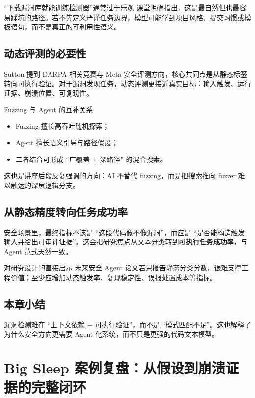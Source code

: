\documentclass[a4paper]{article}
\begin{document}
\begin{warningbox}{“下载漏洞库就能训练检测器”通常过于乐观}
课堂明确指出，这是最自然但也最容易踩坑的路径。若不先定义严谨任务边界，模型可能学到项目风格、提交习惯或模板语句，而不是真正的可利用性语义。
\end{warningbox}

\subsection{动态评测的必要性}
Sutton 提到 DARPA 相关竞赛与 Meta 安全评测方向，核心共同点是从静态标签转向可执行验证。对于漏洞发现任务，动态评测更接近真实目标：输入触发、运行证据、崩溃位置、可复现性。

\begin{knowledgebox}{Fuzzing 与 Agent 的互补关系}
\begin{itemize}
    \item Fuzzing 擅长高吞吐随机探索；
    \item Agent 擅长语义引导与路径假设；
    \item 二者结合可形成 ``广覆盖 + 深路径'' 的混合搜索。
\end{itemize}
这也是讲座后段反复强调的方向：AI 不替代 fuzzing，而是把搜索推向 fuzzer 难以触达的深层逻辑分支。
\end{knowledgebox}

\subsection{从静态精度转向任务成功率}
安全场景里，最终指标不该是 ``这段代码像不像漏洞''，而应是 ``是否能构造触发输入并给出可审计证据''。这会把研究焦点从文本分类转到\textbf{可执行任务成功率}，与 Agent 范式天然一致。

\begin{importantbox}{对研究设计的直接启示}
未来安全 Agent 论文若只报告静态分类分数，很难支撑工程价值；至少应增加动态触发率、复现稳定性、误报处置成本等指标。
\end{importantbox}

\subsection{本章小结}
漏洞检测难在 ``上下文依赖 + 可执行验证''，而不是 ``模式匹配不足''。这也解释了为什么安全方向更需要 Agent 化系统，而不只是更强的代码文本模型。

\section{Big Sleep 案例复盘：从假设到崩溃证据的完整闭环}
\end{document}
